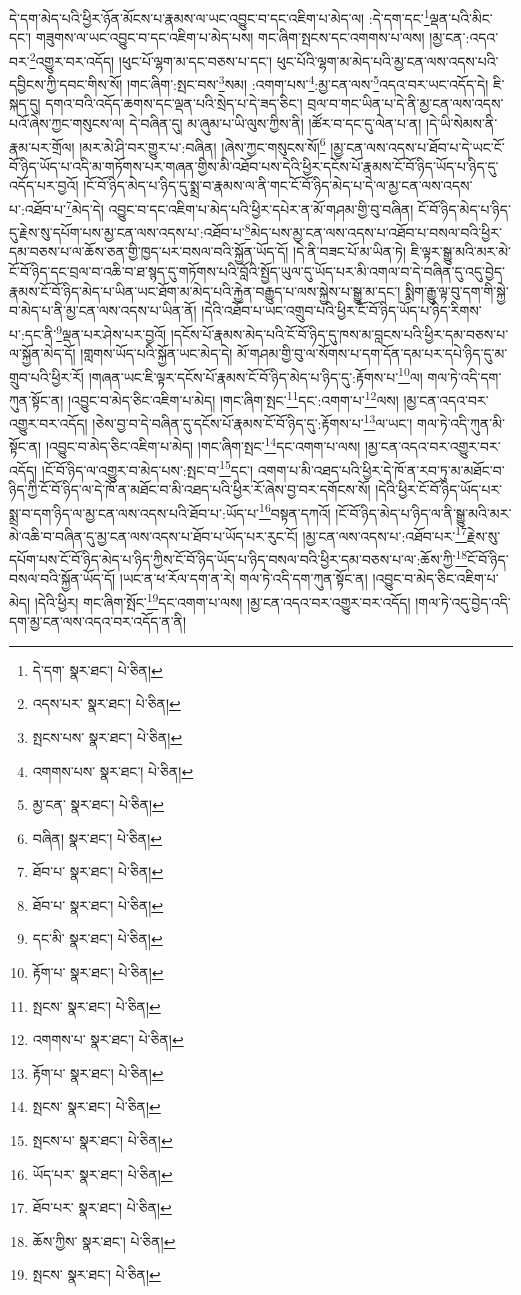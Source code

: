 དེ་དག་མེད་པའི་ཕྱིར་ཉོན་མོངས་པ་རྣམས་ལ་ཡང་འབྱུང་བ་དང་འཇིག་པ་མེད་ལ། :དེ་དག་དང་\footnote{དེ་དག་  སྣར་ཐང་།  པེ་ཅིན། }ལྡན་པའི་མིང་དང་། གཟུགས་ལ་ཡང་འབྱུང་བ་དང་འཇིག་པ་མེད་པས། གང་ཞིག་སྤངས་དང་འགགས་པ་ལས། །མྱ་ངན་:འདའ་བར་\footnote{འདས་པར་  སྣར་ཐང་།  པེ་ཅིན། }འགྱུར་བར་འདོད། །ཕུང་པོ་ལྷག་མ་དང་བཅས་པ་དང་། ཕུང་པོའི་ལྷག་མ་མེད་པའི་མྱ་ངན་ལས་འདས་པའི་དབྱིངས་ཀྱི་དབང་གིས་སོ། །གང་ཞིག་:སྤང་བས་\footnote{སྤངས་པས་  སྣར་ཐང་།  པེ་ཅིན། }སམ། :འགག་པས་\footnote{འགགས་པས་  སྣར་ཐང་།  པེ་ཅིན། }:མྱ་ངན་ལས་\footnote{མྱ་ངན་  སྣར་ཐང་།  པེ་ཅིན། }འདའ་བར་ཡང་འདོད་དེ། ཇི་སྐད་དུ། དགའ་བའི་འདོད་ཆགས་དང་ལྡན་པའི་སྲེད་པ་དེ་ཟད་ཅིང་། བྲལ་བ་གང་ཡིན་པ་དེ་ནི་མྱ་ངན་ལས་འདས་པའོ་ཞེས་ཀྱང་གསུངས་ལ། དེ་བཞིན་དུ། མ་ཞུམ་པ་ཡི་ལུས་ཀྱིས་ནི། །ཚོར་བ་དང་དུ་ལེན་པ་ན། །དེ་ཡི་སེམས་ནི་རྣམ་པར་གྲོལ། །མར་མེ་ཤི་བར་གྱུར་པ་:བཞིན། །ཞེས་ཀྱང་གསུངས་སོ།\footnote{བཞིན།  སྣར་ཐང་།  པེ་ཅིན། } །མྱ་ངན་ལས་འདས་པ་ཐོབ་པ་དེ་ཡང་ངོ་བོ་ཉིད་ཡོད་པ་འདི་མ་གཏོགས་པར་གཞན་གྱིས་མི་འཐོབ་པས་དེའི་ཕྱིར་དངོས་པོ་རྣམས་ངོ་བོ་ཉིད་ཡོད་པ་ཉིད་དུ་འདོད་པར་བྱའོ། །ངོ་བོ་ཉིད་མེད་པ་ཉིད་དུ་སྨྲ་བ་རྣམས་ལ་ནི་གང་ངོ་བོ་ཉིད་མེད་པ་དེ་ལ་མྱ་ངན་ལས་འདས་པ་:འཐོབ་པ་\footnote{ཐོབ་པ་  སྣར་ཐང་།  པེ་ཅིན། }མེད་དེ། འབྱུང་བ་དང་འཇིག་པ་མེད་པའི་ཕྱིར་དཔེར་ན་མོ་གཤམ་གྱི་བུ་བཞིན། ངོ་བོ་ཉིད་མེད་པ་ཉིད་དུ་རྗེས་སུ་དཔོག་པས་མྱ་ངན་ལས་འདས་པ་:འཐོབ་པ་\footnote{ཐོབ་པ་  སྣར་ཐང་།  པེ་ཅིན། }མེད་པས་མྱ་ངན་ལས་འདས་པ་འཐོབ་པ་བསལ་བའི་ཕྱིར་དམ་བཅས་པ་ལ་ཆོས་ཅན་གྱི་ཁྱད་པར་བསལ་བའི་སྐྱོན་ཡོད་དོ། །དེ་ནི་བཟང་པོ་མ་ཡིན་ཏེ། ཇི་ལྟར་སྒྱུ་མའི་མར་མེ་ངོ་བོ་ཉིད་དང་བྲལ་བ་འཆི་བ་ཐ་སྙད་དུ་གཏོགས་པའི་བློའི་སྤྱོད་ཡུལ་དུ་ཡོད་པར་མི་འགལ་བ་དེ་བཞིན་དུ་འདུ་བྱེད་རྣམས་ངོ་བོ་ཉིད་མེད་པ་ཡིན་ཡང་ཐོག་མ་མེད་པའི་རྐྱེན་བརྒྱུད་པ་ལས་སྐྱེས་པ་སྒྱུ་མ་དང་། སྨིག་རྒྱུ་ལྟ་བུ་དག་གི་སྐྱེ་བ་མེད་པ་ནི་མྱ་ངན་ལས་འདས་པ་ཡིན་ནོ། །དེའི་འཐོབ་པ་ཡང་འགྲུབ་པའི་ཕྱིར་ངོ་བོ་ཉིད་ཡོད་པ་ཉིད་རིགས་པ་:དང་ནི་\footnote{དང་མི་  སྣར་ཐང་།  པེ་ཅིན། }ལྡན་པར་ཤེས་པར་བྱའོ། །དངོས་པོ་རྣམས་མེད་པའི་ངོ་བོ་ཉིད་དུ་ཁས་མ་བླངས་པའི་ཕྱིར་དམ་བཅས་པ་ལ་སྐྱོན་མེད་དོ། །གླགས་ཡོད་པའི་སྐྱོན་ཡང་མེད་དེ། མོ་གཤམ་གྱི་བུ་ལ་སོགས་པ་དག་དོན་དམ་པར་དཔེ་ཉིད་དུ་མ་གྲུབ་པའི་ཕྱིར་རོ། །གཞན་ཡང་ཇི་ལྟར་དངོས་པོ་རྣམས་ངོ་བོ་ཉིད་མེད་པ་ཉིད་དུ་:རྟོགས་པ་\footnote{རྟོག་པ་  སྣར་ཐང་།  པེ་ཅིན། }ལ། གལ་ཏེ་འདི་དག་ཀུན་སྟོང་ན། །འབྱུང་བ་མེད་ཅིང་འཇིག་པ་མེད། །གང་ཞིག་སྤང་\footnote{སྤངས་  སྣར་ཐང་།  པེ་ཅིན། }དང་:འགག་པ་\footnote{འགགས་པ་  སྣར་ཐང་།  པེ་ཅིན། }ལས། །མྱ་ངན་འདའ་བར་འགྱུར་བར་འདོད། །ཅེས་བྱ་བ་དེ་བཞིན་དུ་དངོས་པོ་རྣམས་ངོ་བོ་ཉིད་དུ་:རྟོགས་པ་\footnote{རྟོག་པ་  སྣར་ཐང་།  པེ་ཅིན། }ལ་ཡང་། གལ་ཏེ་འདི་ཀུན་མི་སྟོང་ན། །འབྱུང་བ་མེད་ཅིང་འཇིག་པ་མེད། །གང་ཞིག་སྤང་\footnote{སྤངས་  སྣར་ཐང་།  པེ་ཅིན། }དང་འགག་པ་ལས། །མྱ་ངན་འདའ་བར་འགྱུར་བར་འདོད། །ངོ་བོ་ཉིད་ལ་འགྱུར་བ་མེད་པས་:སྤང་བ་\footnote{སྤངས་པ་  སྣར་ཐང་།  པེ་ཅིན། }དང་། འགག་པ་མི་འཐད་པའི་ཕྱིར་དེ་ཁོ་ན་རབ་ཏུ་མ་མཐོང་བ་ཉིད་ཀྱི་ངོ་བོ་ཉིད་ལ་དེ་ཁོ་ན་མཐོང་བ་མི་འཐད་པའི་ཕྱིར་རོ་ཞེས་བྱ་བར་དགོངས་སོ། །དེའི་ཕྱིར་ངོ་བོ་ཉིད་ཡོད་པར་སྨྲ་བ་དག་ཉིད་ལ་མྱ་ངན་ལས་འདས་པའི་ཐོབ་པ་:ཡོད་པ་\footnote{ཡོད་པར་  སྣར་ཐང་།  པེ་ཅིན། }བསྟན་དཀའོ། །ངོ་བོ་ཉིད་མེད་པ་ཉིད་ལ་ནི་སྒྱུ་མའི་མར་མེ་འཆི་བ་བཞིན་དུ་མྱ་ངན་ལས་འདས་པ་ཐོབ་པ་ཡོད་པར་རུང་ངོ། །མྱ་ངན་ལས་འདས་པ་:འཐོབ་པར་\footnote{ཐོབ་པར་  སྣར་ཐང་།  པེ་ཅིན། }རྗེས་སུ་དཔོག་པས་ངོ་བོ་ཉིད་མེད་པ་ཉིད་ཀྱིས་ངོ་བོ་ཉིད་ཡོད་པ་ཉིད་བསལ་བའི་ཕྱིར་དམ་བཅས་པ་ལ་:ཆོས་ཀྱི་\footnote{ཆོས་ཀྱིས་  སྣར་ཐང་།  པེ་ཅིན། }ངོ་བོ་ཉིད་བསལ་བའི་སྐྱོན་ཡོད་དོ། །ཡང་ན་ཕ་རོལ་དག་ན་རེ། གལ་ཏེ་འདི་དག་ཀུན་སྟོང་ན། །འབྱུང་བ་མེད་ཅིང་འཇིག་པ་མེད། །དེའི་ཕྱིར། གང་ཞིག་སྤོང་\footnote{སྤངས་  སྣར་ཐང་།  པེ་ཅིན། }དང་འགག་པ་ལས། །མྱ་ངན་འདའ་བར་འགྱུར་བར་འདོད། །གལ་ཏེ་འདུ་བྱེད་འདི་དག་མྱ་ངན་ལས་འདའ་བར་འདོད་ན་ནི། 